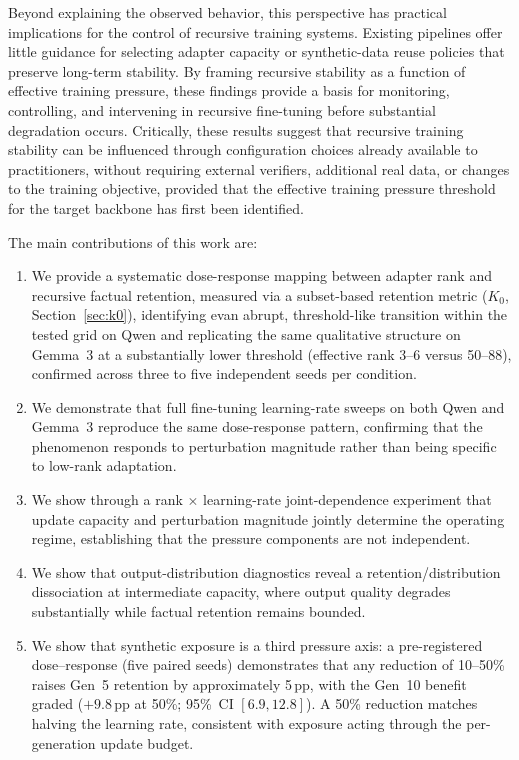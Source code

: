 \documentclass[a4paper,fleqn]{cas-dc}
\newif\ifshowchanges
\newcommand{\rev}[1]{\ifshowchanges{\color{blue}#1}\else{#1}\fi}
\begin{document}
Beyond explaining the observed behavior, this perspective has practical
implications for the control of recursive training systems. Existing
pipelines offer little guidance for selecting adapter capacity or synthetic-data
reuse policies that preserve long-term stability. By framing recursive stability
as a function of effective training pressure, these findings provide a
basis for monitoring, controlling, and intervening in recursive fine-tuning
before substantial degradation occurs. Critically, these results suggest that
recursive training stability can be influenced through configuration choices
already available to practitioners, without requiring external verifiers,
additional real data, or changes to the training objective, provided that the
effective training pressure threshold for the target backbone has first been
identified.

The main contributions of this work are:
\begin{enumerate}
    \item We provide a systematic dose-response mapping between adapter rank and
    recursive factual retention, measured via a subset-based retention metric
    ($K_0$, Section~\ref{sec:k0}), identifying 
ev{an abrupt, threshold-like transition within the tested grid} on Qwen
    and replicating the same qualitative structure on Gemma~3 at a
    substantially lower threshold (effective rank 3--6 versus 50--88),
    confirmed across three to five independent seeds per condition.
    \item We demonstrate that full fine-tuning learning-rate sweeps on both
    Qwen and Gemma~3 reproduce the same dose-response pattern, confirming that
    the phenomenon responds to perturbation magnitude rather than being
    specific to low-rank adaptation.
    \item \rev{We show through a rank $\times$ learning-rate joint-dependence experiment}
    that update capacity and perturbation magnitude jointly determine the
    operating regime, establishing that the pressure components are not
    independent.
    \item We show that output-distribution diagnostics reveal a
    retention/distribution dissociation at intermediate capacity, where output
    quality degrades substantially while factual retention remains bounded.
    \item We show that synthetic exposure is a third pressure axis: a
    pre-registered dose--response (five paired seeds) demonstrates that any
    reduction of 10--50\% raises Gen~5 retention by approximately 5\,pp,
    with the Gen~10 benefit graded ($+9.8$\,pp at 50\%; 95\%~CI $[6.9, 12.8]$).
    A 50\% reduction matches halving the learning rate, consistent with
    exposure acting through the per-generation update budget.
\end{enumerate}
\end{document}
